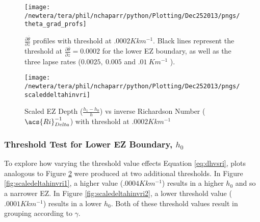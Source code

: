\begin{figure}[htbp]
    \centering
    \texttt{[image: /newtera/tera/phil/nchaparr/python/Plotting/Dec252013/pngs/theta\_grad\_profs]}
    \caption[$\frac{\partial \overline{\theta}}{\partial z}$ Profiles with Threshold at $.0002Kkm^{-1}$]{$\frac{\partial \overline{\theta}}{\partial z}$ profiles with threshold at $.0002Kkm^{-1}$.  Black lines represent the threshold at $\frac{\partial \overline{\theta}}{\partial z} = 0.0002$ for the lower \acs{EZ} boundary, as well as the three lapse rates ($0.0025, \ 0.005$ and $.01 \ Km^{-1}$ ).}
    \label{fig:thresh}   %
\end{figure}

\begin{figure}[htbp]
\centering
 \texttt{[image: /newtera/tera/phil/nchaparr/python/Plotting/Dec252013/pngs/scaleddeltahinvri]}
       
        \caption{Scaled EZ Depth ($\frac{h_{1}-h_{0}}{h}$) vs inverse Richardson Number ($\acs{Ri}_{Delta}^{-1}$) with threshold at $.0002Kkm^{-1}$}
         \label{fig:scaledeltahinvri}
\end{figure}

\clearpage
\subsubsection{Threshold Test for Lower \acs{EZ} Boundary, $h_{0}$}
To explore how varying the threshold value effects Equation \ref{eq:dhvsri}, plots analogous to Figure \ref{fig:scaledeltahinvri} were produced at two 
additional thresholds.  In Figure \ref{fig:scaledeltahinvri1}, a higher value ($.0004Kkm^{-1}$) results in a higher $h_{0}$   
and so a narrower \acs{EZ}.
In Figure \ref{fig:scaledeltahinvri2}, a lower threshold value ($.0001Kkm^{-1}$) results in a lower $h_{0}$.  Both of these threshold values result in grouping according to $\gamma$.\\


